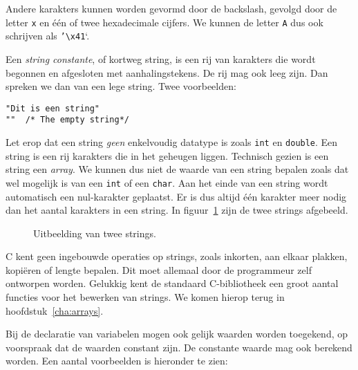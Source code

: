 Andere karakters kunnen worden gevormd door de backslash, gevolgd door de letter \texttt{x} en één of twee hexadecimale cijfers. We kunnen de letter \texttt{A} dus ook schrijven als \texttt{'\textbackslash x41}`.

Een \textsl{string constante}, of kortweg string, is een rij van karakters die wordt begonnen en afgesloten met aanhalingstekens. De rij mag ook leeg zijn. Dan spreken we dan van een lege string. Twee voorbeelden:

\hspace*{1em}\texttt{"Dit is een string"}\\
\hspace*{1em}\lstinline[basicstyle=\ttfamily]|""|\texttt{\ \  /* The empty string*/}

Let erop dat een string \textsl{geen} enkelvoudig datatype is zoals \texttt{int} en \texttt{double}. Een string is een rij karakters die in het geheugen liggen. Technisch gezien is een string een \textsl{array}. We kunnen dus niet de waarde van een string bepalen zoals dat wel mogelijk is van een \texttt{int} of een \texttt{char}. Aan het einde van een string wordt automatisch een nul-karakter geplaatst. Er is dus altijd één karakter meer nodig dan het aantal karakters in een string. In figuur~\ref{fig:varstrings} zijn de twee strings afgebeeld.

\begin{figure}[!ht]
\centering
{}
\caption{Uitbeelding van twee strings.}
\label{fig:varstrings}
\end{figure}

C kent geen ingebouwde operaties op strings, zoals inkorten, aan elkaar plakken, kopiëren of lengte bepalen. Dit moet allemaal door de programmeur zelf ontworpen worden. Gelukkig kent de standaard C-bibliotheek een groot aantal functies voor het bewerken van strings. We komen hierop terug in hoofdstuk~\ref{cha:arrays}.

Bij de declaratie van variabelen mogen ook gelijk waarden worden toegekend, op voorspraak dat de waarden constant zijn. De constante waarde mag ook berekend worden. Een aantal voorbeelden is hieronder te zien:

